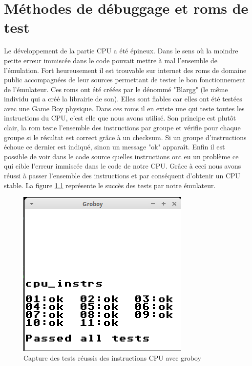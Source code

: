 \documentclass[french]{report}
\begin{document}
\chapter{Méthodes de débuggage et roms de test}
Le développement de la partie CPU a été épineux. Dans le sens où la moindre petite erreur immiscée dans le code pouvait mettre à mal l'ensemble de l'émulation. Fort heureusement il est trouvable sur internet des roms de domaine public accompagnées de leur sources permettant de tester le bon fonctionnement de l'émulateur. Ces roms ont été créées par le dénommé "Blargg" (le même individu qui a créé la librairie de son). Elles sont fiables car elles ont été testées avec une Game Boy physique. Dans ces roms il en existe une qui teste toutes les instructions du CPU, c'est elle que nous avons utilisé. Son principe est plutôt clair, la rom teste l'ensemble des instructions par groupe et vérifie pour chaque groupe si le résultat est correct grâce à un checksum. Si un groupe d'instructions échoue ce dernier est indiqué, sinon un message "ok" apparaît. Enfin il est possible de voir dans le code source quelles instructions ont eu un problème ce qui cible l'erreur immiscée dans le code de notre CPU. Grâce à ceci nous avons réussi à passer l'ensemble des instructions et par conséquent d'obtenir un CPU stable. La figure \ref{testcpu} représente le succès des tests par notre émulateur.
\begin{figure}[!h]
\centering
\includegraphics[scale=0.4]{images/screenshot_cpu_blargg.png}
\caption{Capture des tests réussis des instructions CPU avec groboy}
\label{testcpu}
\end{figure}
\printglossaries
\newpage
\end{document}
